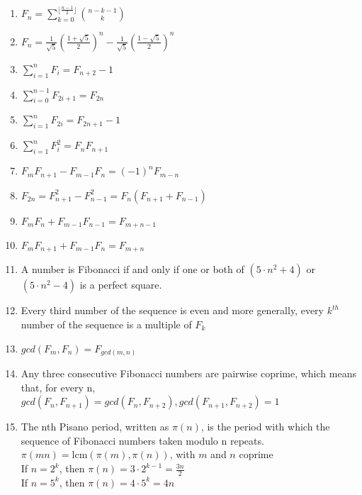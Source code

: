 \begin{enumerate}
  \item $F_n = \sum_{k=0}^{\lfloor\frac{n-1}{2}\rfloor} \binom{n - k - 1}{k}$
  \item $F_n = \frac{1}{\sqrt{5}} \left( \frac{1 + \sqrt{5}}{2} \right)^n - \frac{1}{\sqrt{5}} \left( \frac{1 - \sqrt{5}}{2} \right)^n$
  \item $\sum_{i=1}^{n} F_i = F_{n+2} - 1$
  \item $\sum_{i=0}^{n-1} F_{2i+1} = F_{2n}$
  \item $\sum_{i=1}^{n} F_{2i} = F_{2n+1} - 1$
  \item $\sum_{i=1}^{n} F_{i}^2 = F_n F_{n+1}$
  \item $F_m F_{n+1} - F_{m-1} F_n = (-1)^n F_{m-n}$
  \item $F_{2n} = F_{n+1}^2 - F_{n-1}^2 = F_n(F_{n+1} + F_{n-1})$
  \item $F_m F_n + F_{m-1} F_{n-1} = F_{m+n-1}$
  \item $F_m F_{n+1} + F_{m-1} F_n = F_{m+n}$
  \item A number is Fibonacci if and only if one or both of $(5 \cdot n^2 + 4)$ or $(5 \cdot n^2 - 4)$ is a perfect square.
  \item Every third number of the sequence is even and more generally, every $k^{th}$ number of the sequence is a multiple of $F_k$
  \item $gcd(F_m, F_n) = F_{gcd(m,n)}$
  \item Any three consecutive Fibonacci numbers are pairwise coprime, which means that, for every n,\\
  $gcd(F_n, F_{n+1}) = gcd(F_n, F_{n+2}), gcd(F_{n+1}, F_{n+2}) = 1$
  \item The nth Pisano period, written as $\pi(n)$, is the period with which the sequence of Fibonacci numbers taken modulo n repeats.\\
  $\pi(mn) = \text{lcm}(\pi(m), \pi(n))$, with $m$ and $n$ coprime\\
  If $n = 2^k$, then $\pi(n) = 3 \cdot 2^{k-1} = \frac{3n}{2}$\\
  If $n = 5^k$, then $\pi(n) = 4 \cdot 5^k = 4n$
\end{enumerate}
